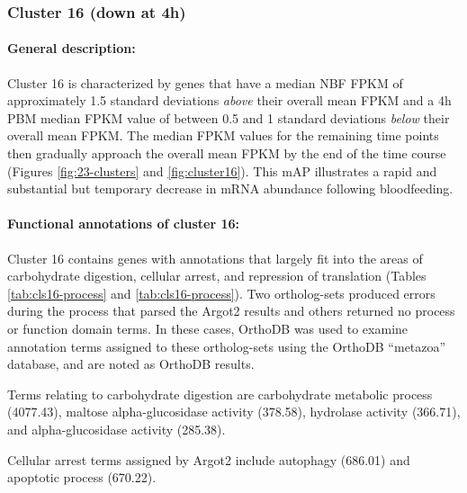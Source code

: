 \subsubsection{Cluster 16 (down at 4h)}

\paragraph*{General description:}

Cluster 16 is characterized by genes that have a median \gls{NBF} \gls{FPKM} of approximately 1.5 standard deviations \textit{above} their overall mean \gls{FPKM} and a 4h \gls{PBM} median \gls{FPKM} value of between 0.5 and 1 standard deviations \textit{below} their overall mean \gls{FPKM}. The median \gls{FPKM} values for the remaining time points then gradually approach the overall mean \gls{FPKM} by the end of the time course (Figures \ref{fig:23-clusters} and \ref{fig:cluster16}).
%
This \gls{mAP} illustrates a rapid and substantial but temporary decrease in mRNA abundance following bloodfeeding.
%



\paragraph*{Functional annotations of cluster 16:}


Cluster 16 contains genes with annotations that largely fit into the areas of carbohydrate digestion, cellular arrest, and repression of translation (Tables \ref{tab:cls16-process} and \ref{tab:cls16-process}).
%
Two ortholog-sets produced errors during the process that parsed the \gls{Argot2} results and others returned no process or function domain terms.
%
In these cases, OrthoDB was used to examine annotation terms assigned to these ortholog-sets using the OrthoDB ``metazoa'' database, and are noted as OrthoDB results.




Terms relating to carbohydrate digestion are carbohydrate metabolic process (4077.43), maltose alpha-glucosidase activity (378.58), hydrolase activity (366.71), and alpha-glucosidase activity (285.38).

Cellular arrest terms assigned by \gls{Argot2} include autophagy (686.01) and apoptotic process (670.22).

